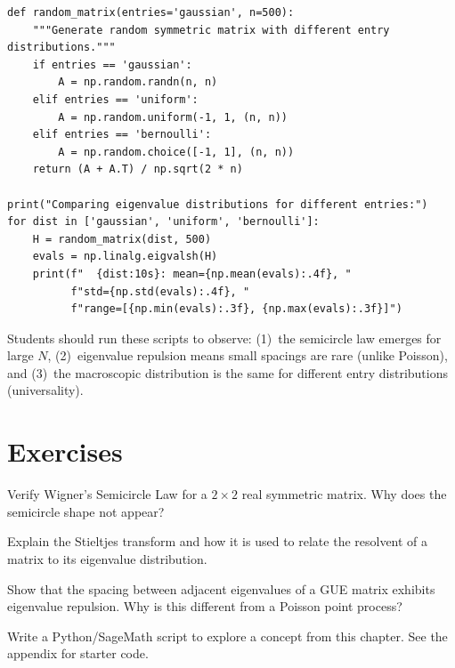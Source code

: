 \begin{verbatim}
def random_matrix(entries='gaussian', n=500):
    """Generate random symmetric matrix with different entry distributions."""
    if entries == 'gaussian':
        A = np.random.randn(n, n)
    elif entries == 'uniform':
        A = np.random.uniform(-1, 1, (n, n))
    elif entries == 'bernoulli':
        A = np.random.choice([-1, 1], (n, n))
    return (A + A.T) / np.sqrt(2 * n)

print("Comparing eigenvalue distributions for different entries:")
for dist in ['gaussian', 'uniform', 'bernoulli']:
    H = random_matrix(dist, 500)
    evals = np.linalg.eigvalsh(H)
    print(f"  {dist:10s}: mean={np.mean(evals):.4f}, "
          f"std={np.std(evals):.4f}, "
          f"range=[{np.min(evals):.3f}, {np.max(evals):.3f}]")
\end{verbatim}

\begin{highlightbox}
Students should run these scripts to observe: (1)~the semicircle law emerges for large $N$, (2)~eigenvalue repulsion means small spacings are rare (unlike Poisson), and (3)~the macroscopic distribution is the same for different entry distributions (universality).
\end{highlightbox}

\section{Exercises}

\begin{exercise}[Basic]
Verify Wigner's Semicircle Law for a $2 \times 2$ real symmetric matrix. Why does the semicircle shape not appear?
\end{exercise}

\begin{exercise}[Intermediate]
Explain the Stieltjes transform and how it is used to relate the resolvent of a matrix to its eigenvalue distribution.
\end{exercise}

\begin{exercise}[Challenge]
Show that the spacing between adjacent eigenvalues of a GUE matrix exhibits eigenvalue repulsion. Why is this different from a Poisson point process?
\end{exercise}

\begin{exercise}[Computational]
Write a Python/SageMath script to explore a concept from this chapter. See the appendix for starter code.
\end{exercise}

